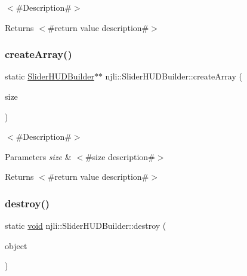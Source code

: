 $<$\#\+Description\#$>$

\begin{DoxyReturn}{Returns}
$<$\#return value description\#$>$ 
\end{DoxyReturn}
\mbox{\label{classnjli_1_1_slider_h_u_d_builder_a680aaace6d70491bbe44a3fa1f559e05}} 
\subsubsection{\texorpdfstring{create\+Array()}{createArray()}}
{\footnotesize\ttfamily static \mbox{\hyperlink{classnjli_1_1_slider_h_u_d_builder}{Slider\+H\+U\+D\+Builder}}$\ast$$\ast$ njli\+::\+Slider\+H\+U\+D\+Builder\+::create\+Array (\begin{DoxyParamCaption}\item[{const \mbox{\hyperlink{_util_8h_a10e94b422ef0c20dcdec20d31a1f5049}{u32}}}]{size }\end{DoxyParamCaption})\hspace{0.3cm}{\ttfamily [static]}}

$<$\#\+Description\#$>$


\begin{DoxyParams}{Parameters}
{\em size} & $<$\#size description\#$>$\\
\hline
\end{DoxyParams}
\begin{DoxyReturn}{Returns}
$<$\#return value description\#$>$ 
\end{DoxyReturn}
\mbox{\label{classnjli_1_1_slider_h_u_d_builder_a36c97ae77bfd67c0896fb12a18656e28}} 
\subsubsection{\texorpdfstring{destroy()}{destroy()}}
{\footnotesize\ttfamily static \mbox{\hyperlink{_thread_8h_af1e856da2e658414cb2456cb6f7ebc66}{void}} njli\+::\+Slider\+H\+U\+D\+Builder\+::destroy (\begin{DoxyParamCaption}\item[{\mbox{\hyperlink{classnjli_1_1_slider_h_u_d_builder}{Slider\+H\+U\+D\+Builder}} $\ast$}]{object }\end{DoxyParamCaption})\hspace{0.3cm}{\ttfamily [static]}}

